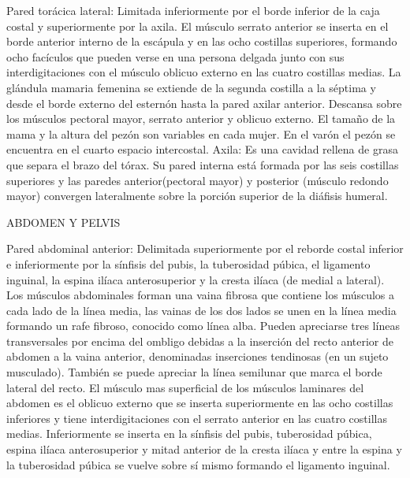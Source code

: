 Pared torácica lateral: Limitada inferiormente por el borde inferior de la caja costal y superiormente por la axila.
El músculo serrato anterior se inserta en el borde anterior interno de la escápula y en las ocho costillas superiores, formando ocho facículos que pueden verse en una persona delgada junto con sus interdigitaciones con el músculo oblicuo externo en las cuatro costillas medias.
La glándula mamaria femenina se extiende de la segunda costilla a la séptima y desde el borde externo del esternón hasta la pared axilar anterior. Descansa sobre los músculos  pectoral mayor, serrato anterior y oblicuo externo. El tamaño de la mama y la altura del pezón son variables en cada mujer. En el varón el pezón se encuentra en el cuarto espacio intercostal.
Axila: Es una cavidad rellena de grasa que separa el brazo del tórax. Su pared interna está formada por las seis costillas superiores y las paredes anterior(pectoral mayor) y posterior (músculo redondo mayor) convergen lateralmente sobre la porción superior de la diáfisis humeral.


ABDOMEN Y PELVIS

Pared abdominal anterior: Delimitada superiormente por el reborde costal inferior e inferiormente por la sínfisis del pubis, la tuberosidad púbica, el ligamento inguinal, la espina ilíaca anterosuperior y la cresta ilíaca (de medial a lateral). Los músculos abdominales forman una vaina fibrosa que contiene los músculos a cada lado de la línea media, las vainas de los dos lados se unen en la línea media formando un rafe fibroso, conocido como línea alba. Pueden apreciarse tres líneas transversales por encima del ombligo debidas a la inserción del recto anterior de abdomen a la vaina anterior, denominadas inserciones tendinosas (en un sujeto musculado). También se puede apreciar la línea semilunar que marca el borde lateral del recto. El músculo mas superficial de los músculos laminares del abdomen es el oblicuo externo que se inserta superiormente en las ocho costillas inferiores y tiene interdigitaciones con el serrato anterior en las cuatro costillas medias. Inferiormente se inserta en la sínfisis del pubis, tuberosidad púbica, espina ilíaca anterosuperior y mitad anterior de la cresta ilíaca y entre la espina y la tuberosidad púbica se vuelve sobre sí mismo formando el ligamento inguinal.

